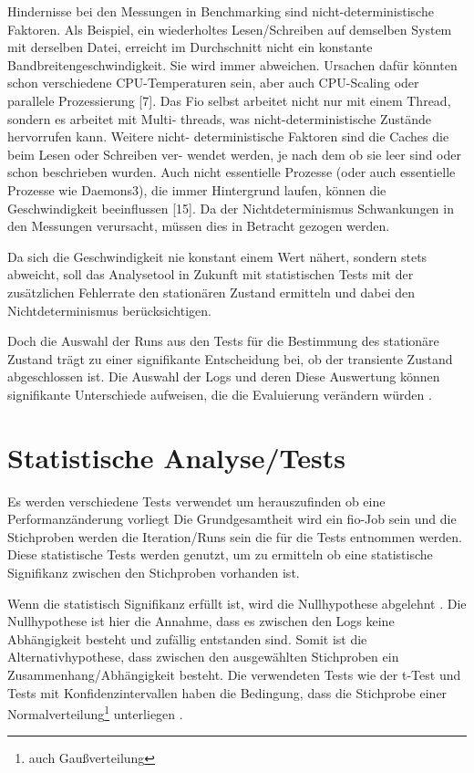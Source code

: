 Hindernisse bei den Messungen in Benchmarking sind nicht-deterministische Faktoren.
Als Beispiel, ein wiederholtes Lesen/Schreiben auf demselben System mit derselben Datei, erreicht im Durchschnitt nicht ein konstante Bandbreitengeschwindigkeit. 
Sie wird immer abweichen. Ursachen dafür könnten schon verschiedene CPU-Temperaturen sein, 
aber auch CPU-Scaling oder parallele Prozessierung [7]. Das Fio
selbst arbeitet nicht nur mit einem Thread, sondern es arbeitet mit Multi-
threads, was nicht-deterministische Zustände hervorrufen kann. Weitere nicht-
deterministische Faktoren sind die Caches die beim Lesen oder Schreiben ver-
wendet werden, je nach dem ob sie leer sind oder schon beschrieben wurden.
Auch nicht essentielle Prozesse (oder auch essentielle Prozesse wie Daemons3),
die immer Hintergrund laufen, können die Geschwindigkeit beeinflussen [15].
Da der Nichtdeterminismus Schwankungen in den Messungen verursacht, müssen dies in Betracht gezogen werden.

Da sich die Geschwindigkeit nie konstant einem Wert nähert, sondern stets
abweicht, soll das Analysetool in Zukunft mit statistischen Tests mit der zusätzlichen Fehlerrate den stationären
Zustand ermitteln und dabei den Nichtdeterminismus berücksichtigen.

Doch die Auswahl der Runs aus den Tests für die Bestimmung des stationäre Zustand trägt zu einer signifikante Entscheidung bei,
 ob der transiente Zustand abgeschlossen ist.
Die Auswahl der Logs und deren Diese Auswertung können signifikante Unterschiede aufweisen, die die Evaluierung
verändern würden \cite{when_stop_tests}.



\section{Statistische Analyse/Tests}
Es werden verschiedene Tests verwendet um herauszufinden ob eine Performanzänderung vorliegt \cite{statistically_rigorous}
Die Grundgesamtheit wird ein fio-Job sein und die Stichproben werden die Iteration/Runs sein die für die Tests entnommen werden.
Diese statistische Tests werden genutzt, um zu ermitteln ob eine statistische Signifikanz zwischen den Stichproben vorhanden ist.

Wenn die statistisch Signifikanz erfüllt ist, wird die Nullhypothese abgelehnt \cite{inferenzstatistik}.
Die Nullhypothese ist hier die Annahme, dass es zwischen den Logs keine Abhängigkeit besteht und zufällig entstanden sind.
Somit ist die Alternativhypothese, dass zwischen den ausgewählten Stichproben ein Zusammenhang/Abhängigkeit besteht.
Die verwendeten Tests wie der t-Test und Tests mit Konfidenzintervallen haben die Bedingung, 
dass die Stichprobe einer Normalverteilung\footnote{auch Gaußverteilung} unterliegen \cite{inferenzstatistik}. 

